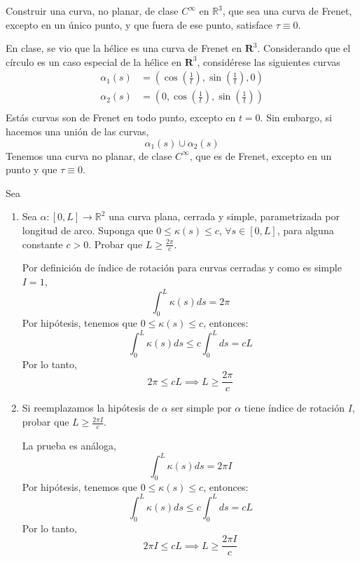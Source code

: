\begin{problema}
    Construir una curva, no planar, de clase $C^{\infty}$ en $\mathbb{R}^{3}$, que sea una curva de Frenet, excepto en un único punto, y que fuera de ese punto, satisface $\tau \equiv 0$.
    \begin{sol}
        En clase, se vio que la hélice es una curva de Frenet en $\mathbf{R}^3$. Considerando que el círculo es un caso especial de la hélice en $\mathbf{R}^3$, considérese las siguientes curvas
        \begin{align*}
            \alpha_1(s) &= \left(\cos \left(\frac{1}{t}\right), \sin\left(\frac{1}{t}\right),0 \right)\\
            \alpha_2(s) &= \left(0, \cos \left(\frac{1}{t}\right), \sin\left(\frac{1}{t}\right)\right)\\
        \end{align*}
        Estás curvas son de Frenet en todo punto, excepto en $t=0$. Sin embargo, si hacemos una unión de las curvas, 
        $$\alpha_1(s)\cup \alpha_2(s)$$
        Tenemos una curva no planar, de clase $C^\infty$, que es de Frenet, excepto en un punto y que $\tau\equiv 0$. 
    \end{sol}
\end{problema}

\begin{problema} 
    Sea
    \begin{enumerate}
        \item Sea $\alpha:[0, L] \rightarrow \mathbb{R}^{2}$ una curva plana, cerrada y simple, parametrizada por longitud de arco. Suponga que $0 \leq \kappa(s) \leq c$, $\forall s \in[0, L]$, para alguna constante $c>0$. Probar que $L \geq \frac{2 \pi}{c}$.
        \begin{sol}
            Por definición de índice de rotación para curvas cerradas y como es simple $I=1$,
            $$\int_0^L \kappa(s) ds=2\pi $$
            Por hipótesis, tenemos que $0 \leq \kappa(s) \leq c$, entonces: 
            $$\int_0^L \kappa(s) ds\leq c\int_0^L ds=cL$$
            Por lo tanto, 
            $$2\pi \leq cL\implies L \geq \frac{2 \pi}{c}$$
        \end{sol}
        \item Si reemplazamos la hipótesis de $\alpha$ ser simple por $\alpha$ tiene índice de rotación $I$, probar que $L \geq \frac{2 \pi I}{c}$.
        \begin{sol}
            La prueba es análoga, 
            $$\int_0^L \kappa(s) ds=2\pi I  $$
            Por hipótesis, tenemos que $0 \leq \kappa(s) \leq c$, entonces: 
            $$\int_0^L \kappa(s) ds\leq c\int_0^L ds=cL$$
            Por lo tanto, 
            $$2\pi I \leq cL\implies L \geq \frac{2 \pi I}{c}$$
        \end{sol}
    \end{enumerate}
\end{problema}

